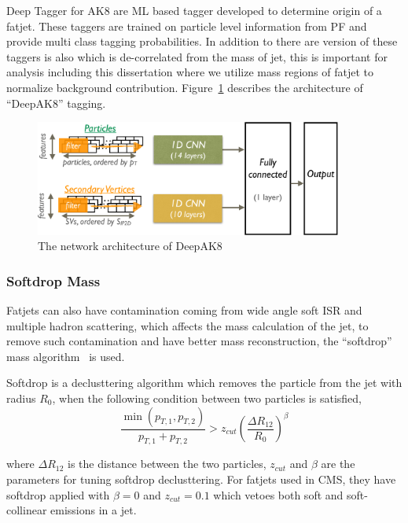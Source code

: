 Deep Tagger for AK8 are \gls{ML} based tagger developed to determine
origin of a fatjet. These taggers are trained on particle level information
from \gls{PF} and provide multi class tagging probabilities. In addition to
there are version of these taggers is also which is de-correlated from the mass of jet,
this is important for analysis including this dissertation where we utilize
mass regions of fatjet to normalize background contribution. Figure~\ref{fig:cms-deepAK8-arch}
describes the architecture of ``DeepAK8'' tagging.

\begin{figure}[!ht]
  \centering
  \includegraphics[width=0.9\textwidth]{figures/CMS_JME_18_002_Figure_009.pdf}
  \caption[The network architecture of DeepAK8]%
  {The network architecture of DeepAK8~\cite{cms-jme-deep-tagger}}%
  \label{fig:cms-deepAK8-arch}
\end{figure}

\subsubsection{
  Softdrop Mass
}

Fatjets can also have contamination coming from wide angle
soft \gls{ISR} and multiple hadron scattering,
which affects the mass calculation of the jet, to remove
such contamination and have better mass reconstruction, the
``softdrop'' mass algorithm~\cite{softdrop-mass-2014} is used.

Softdrop is a declusttering algorithm which removes the particle from the jet
with radius \( R_0 \), when the following condition between two particles is satisfied,
%
\begin{equation}
  \frac{\min(p_{T,1}, p_{T,2})}{p_{T,1} + p_{T,2}} > z_{cut} {\left( \frac{\Delta R_{12}}{R_0} \right)}^{\beta}
\end{equation}

where \( \Delta R_{12} \) is the distance between the two particles, \( z_{cut} \)
and \( \beta \) are the parameters for tuning softdrop declusttering.
For fatjets used in \gls{CMS}, they have softdrop applied with
\( \beta = 0\) and \( z_{cut} = 0.1\) which vetoes both soft
and soft-collinear emissions in a jet.

